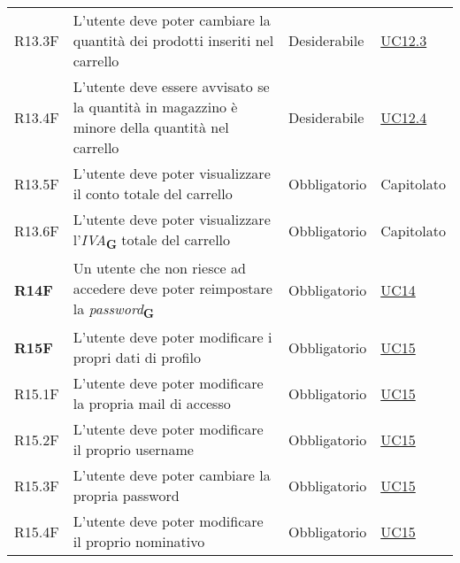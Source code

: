 \begin{center}
\begin{longtable}[!h]{p{50px} p{245px} p{75px} p{50px}}
        R13.3F                                & L'utente deve poter cambiare la quantità dei prodotti inseriti nel carrello                                & Desiderabile             & \hyperref[sec:UC12.3]{UC12.3}                \\
        R13.4F                                & L'utente deve essere avvisato se la quantità in magazzino è minore della quantità nel carrello             & Desiderabile             & \hyperref[sec:UC12.4]{UC12.4}                \\
        R13.5F                                & L'utente deve poter visualizzare il conto totale del carrello                                              & Obbligatorio             & Capitolato                                   \\
        R13.6F                                & L'utente deve poter visualizzare l'\textit{IVA}\textsubscript{\textbf{G}} totale del carrello              & Obbligatorio             & Capitolato                                   \\
        \textbf{R14F}                         & Un utente che non riesce ad accedere deve poter reimpostare la \textit{password}\textsubscript{\textbf{G}} & Obbligatorio             & \hyperref[sec:UC14]{UC14}                    \\
        \textbf{R15F}                         & L'utente deve poter modificare i propri dati di profilo                                                    & Obbligatorio             & \hyperref[sec:UC15]{UC15}                    \\
        R15.1F                                & L'utente deve poter modificare la propria mail di accesso                                                  & Obbligatorio             & \hyperref[sec:UC15]{UC15}                    \\
        R15.2F                                & L'utente deve poter modificare il proprio username                                                         & Obbligatorio             & \hyperref[sec:UC15]{UC15}                    \\
        R15.3F                                & L'utente deve poter cambiare la propria password                                                           & Obbligatorio             & \hyperref[sec:UC15]{UC15}                    \\
        R15.4F                                & L'utente deve poter modificare il proprio nominativo                                                       & Obbligatorio             & \hyperref[sec:UC15]{UC15}                    \\

\end{longtable}
\end{center}
